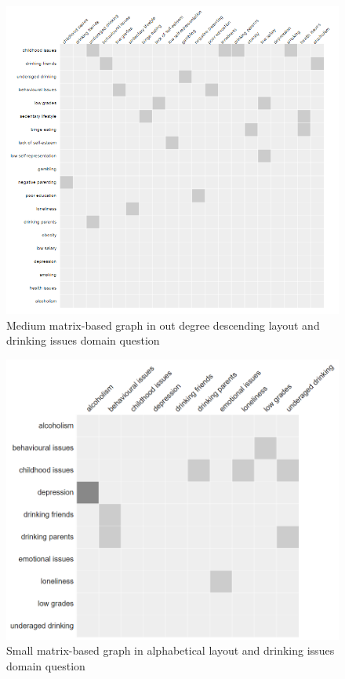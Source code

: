 \documentclass{l4proj}
\begin{document}
\begin{appendices}
\begin{figure}[H]
\centering
\includegraphics[width=16cm]{images/drinkingMedOutDD.PNG}
\caption{Medium matrix-based graph in out degree descending layout and drinking issues domain question}
\label{drinkingMedOutDD}
\end{figure}

\begin{figure}[H]
\centering
\includegraphics[width=16cm]{images/drinkingSmallAlpha.PNG}
\caption{Small matrix-based graph in alphabetical layout and drinking issues domain question}
\label{drinkingSmallAlpha}
\end{figure}


\end{appendices}
\end{document}
